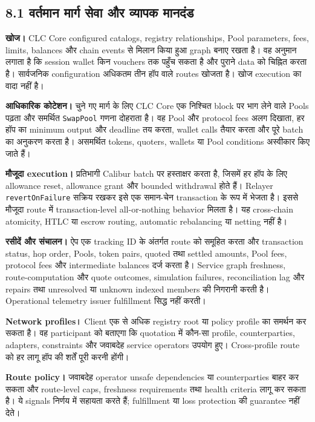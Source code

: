 \documentclass[11pt]{article}
\begin{document}
\subsection*{8.1 वर्तमान मार्ग सेवा और व्यापक मानदंड}

\textbf{खोज।} CLC Core configured catalogs, registry relationships, Pool parameters, fees, limits, balances और chain events से मिलान किया हुआ graph बनाए रखता है। वह अनुमान लगाता है कि session wallet किन vouchers तक पहुँच सकता है और पुराने data को चिह्नित करता है। सार्वजनिक configuration अधिकतम तीन हॉप वाले routes खोजता है। खोज execution का वादा नहीं है।

\textbf{आधिकारिक कोटेशन।} चुने गए मार्ग के लिए CLC Core एक निश्चित block पर भाग लेने वाले Pools पढ़ता और समर्थित \texttt{SwapPool} गणना दोहराता है। वह Pool और protocol fees अलग दिखाता, हर हॉप का minimum output और deadline तय करता, wallet calls तैयार करता और पूरे batch का अनुकरण करता है। असमर्थित tokens, quoters, wallets या Pool conditions अस्वीकार किए जाते हैं।

\textbf{मौजूदा execution।} प्रतिभागी Calibur batch पर हस्ताक्षर करता है, जिसमें हर हॉप के लिए allowance reset, allowance grant और bounded withdrawal होते हैं। Relayer \texttt{revertOnFailure} सक्रिय रखकर इसे एक समान-चेन transaction के रूप में भेजता है। इससे मौजूदा route में transaction-level all-or-nothing behavior मिलता है। यह cross-chain atomicity, HTLC या escrow routing, automatic rebalancing या netting नहीं है।

\textbf{रसीदें और संचालन।} ऐप एक tracking ID के अंतर्गत route को समूहित करता और transaction status, hop order, Pools, token pairs, quoted तथा settled amounts, Pool fees, protocol fees और intermediate balances दर्ज करता है। Service graph freshness, route-computation और quote outcomes, simulation failures, reconciliation lag और repairs तथा unresolved या unknown indexed members की निगरानी करती है। Operational telemetry issuer fulfillment सिद्ध नहीं करती।

\textbf{Network profiles।} Client एक से अधिक registry root या policy profile का समर्थन कर सकता है। वह participant को बताएगा कि quotation में कौन-सा profile, counterparties, adapters, constraints और जवाबदेह service operators उपयोग हुए। Cross-profile route को हर लागू हॉप की शर्तें पूरी करनी होंगी।

\textbf{Route policy।} जवाबदेह operator unsafe dependencies या counterparties बाहर कर सकता और route-level caps, freshness requirements तथा health criteria लागू कर सकता है। ये signals निर्णय में सहायता करते हैं; fulfillment या loss protection की guarantee नहीं देते।
\end{document}
